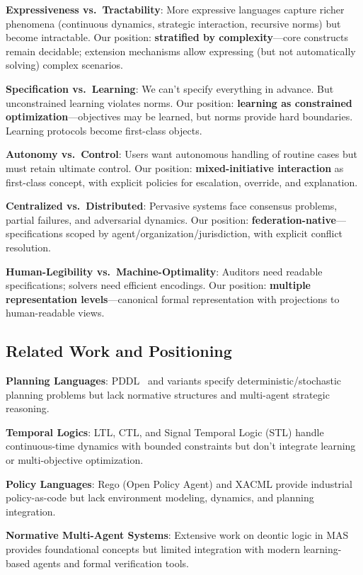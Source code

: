 \documentclass[conference]{IEEEtran}
\begin{document}
\textbf{Expressiveness vs.\ Tractability}: More expressive languages
capture richer phenomena (continuous dynamics, strategic interaction,
recursive norms) but become intractable. Our position:
\textbf{stratified by complexity}---core constructs remain decidable;
extension mechanisms allow expressing (but not automatically solving)
complex scenarios.

\textbf{Specification vs.\ Learning}: We can't specify everything in
advance. But unconstrained learning violates norms. Our position:
\textbf{learning as constrained optimization}---objectives may be
learned, but norms provide hard boundaries. Learning protocols become
first-class objects.

\textbf{Autonomy vs.\ Control}: Users want autonomous handling of routine
cases but must retain ultimate control. Our position:
\textbf{mixed-initiative interaction} as first-class concept, with
explicit policies for escalation, override, and explanation.

\textbf{Centralized vs.\ Distributed}: Pervasive systems face consensus
problems, partial failures, and adversarial dynamics. Our position:
\textbf{federation-native}---specifications scoped by
agent/organization/jurisdiction, with explicit conflict resolution.

\textbf{Human-Legibility vs.\ Machine-Optimality}: Auditors need readable
specifications; solvers need efficient encodings. Our position:
\textbf{multiple representation levels}---canonical formal
representation with projections to human-readable views.

\subsection{Related Work and Positioning}

\textbf{Planning Languages}: PDDL~\cite{ghallab2004} and variants specify
deterministic/stochastic planning problems but lack normative structures
and multi-agent strategic reasoning.

\textbf{Temporal Logics}: LTL, CTL, and Signal Temporal Logic (STL)
handle continuous-time dynamics with bounded constraints but don't
integrate learning or multi-objective optimization.

\textbf{Policy Languages}: Rego (Open Policy Agent) and XACML provide
industrial policy-as-code but lack environment modeling, dynamics, and
planning integration.

\textbf{Normative Multi-Agent Systems}: Extensive work on deontic logic
in MAS~\cite{carmo2002,dignum2004,sergot2001} provides foundational concepts but limited
integration with modern learning-based agents and formal verification
tools.
\end{document}
